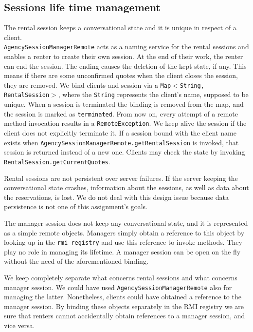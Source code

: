 \subsection{Sessions life time management}
The rental session keeps a conversational state and it is unique in respect of a client. \\\texttt{AgencySessionManagerRemote} acts as a naming service for the rental sessions and enables a renter to create their own session. At the end of their work, the renter can end the session. The ending causes the deletion of the kept state, if any. This means if there are some unconfirmed quotes when the client closes the session, they are removed. We bind clients and session via a \texttt{Map$<$String, RentalSession$>$}, where the \texttt{String} represents the client's name, supposed to be unique. When a session is terminated the binding is removed from the map, and the session is marked as \texttt{terminated}. From now on, every attempt of a remote method invocation results in a \texttt{RemoteException}. We keep alive the session if the client does not explicitly terminate it. If a session bound with the client name exists when \texttt{AgencySessionManagerRemote.getRentalSession} is invoked, that session is returned instead of a new one. Clients may check the state by invoking \texttt{RentalSession.getCurrentQuotes}.

Rental sessions are not persistent over server failures. If the server keeping the conversational state crashes, information about the sessions, as well as data about the reservations, is lost. We do not deal with this design issue because data persistence is not one of this assignment's goals. 

The manager session does not keep any conversational state, and it is represented as a simple remote objects. Managers simply obtain a reference to this object by looking up in the \texttt{rmi registry} and use this reference to invoke methods. They play no role in managing its lifetime. A manager session can be open on the fly without the need of the aforementioned binding.

We keep completely separate what concerns rental sessions and what concerns manager session. We could have used \texttt{AgencySessionManagerRemote} also for managing the latter. Nonetheless, clients could have obtained a reference to the manager session. By binding these objects separately in the RMI registry we are sure that renters cannot accidentally obtain references to a manager session, and vice versa.

